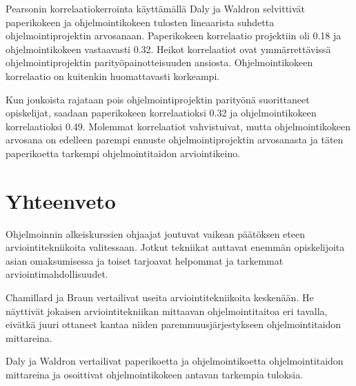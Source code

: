 \documentclass[finnish]{../tktltiki2}
\theoremstyle{definition}
\theoremstyle{remark}
\begin{document}
Pearsonin korrelaatiokerrointa käyttämällä Daly ja Waldron selvittivät paperikokeen ja ohjelmointikokeen tulosten lineaarista suhdetta ohjelmointiprojektin arvosanaan. Paperikokeen korrelaatio projektiin oli 0.18 ja ohjelmointikokeen vastaavasti 0.32. Heikot korrelaatiot ovat ymmärrettävissä ohjelmointiprojektin parityöpainotteisuuden ansiosta. Ohjelmointikokeen korrelaatio on kuitenkin huomattavasti korkeampi.

Kun joukoista rajataan pois ohjelmointiprojektin parityönä suorittaneet opiskelijat, saadaan paperikokeen korrelaatioksi 0.32 ja ohjelmointikokeen korrelaatioksi 0.49. Molemmat korrelaatiot vahvistuivat, mutta ohjelmointikokeen arvosana on edelleen parempi ennuste ohjelmointiprojektin arvosanasta ja täten paperikoetta tarkempi ohjelmointitaidon arviointikeino.

\section{Yhteenveto}

Ohjelmoinnin alkeiskurssien ohjaajat joutuvat vaikean päätöksen eteen arviointitekniikoita valitessaan. Jotkut tekniikat auttavat enemmän opiskelijoita asian omaksumisessa ja toiset tarjoavat helpommat ja tarkemmat arviointimahdollisuudet.

Chamillard ja Braun vertailivat useita arviointitekniikoita keskenään. He näyttivät jokaisen arviointitekniikan mittaavan ohjelmointitaitoa eri tavalla, eivätkä juuri ottaneet kantaa niiden paremmuusjärjestykseen ohjelmointitaidon mittareina.

Daly ja Waldron vertailivat paperikoetta ja ohjelmointikoetta ohjelmointitaidon mittareina ja osoittivat ohjelmointikokeen antavan tarkempia tuloksia.





\end{document}
